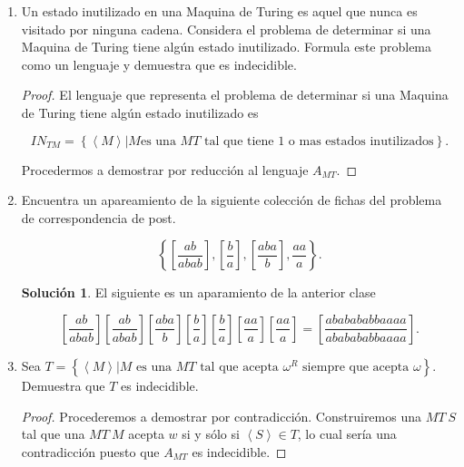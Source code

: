 \documentclass[letterpaper]{article}
\theoremstyle{definition}
\theoremstyle{lemathm}
\theoremstyle{lemathm}
\newtheorem{sol}{Solución}
\theoremstyle{lemathm}
\theoremstyle{lemademthm}
\newcommand{\pars}[1]{\left( #1 \right) }
\newcommand{\bracs}[1]{\left[ #1 \right] }
\newcommand{\inprod}[1]{\left\langle #1 \right\rangle }
\newcommand{\set}[1]{\left \{ #1 \right\} }
\newcommand{\1}{\mathbbm{1}}
\begin{document}
\begin{enumerate}
\begin{proof}
				\[B_{TM} = \set{\omega\omega' | \omega\in\set{a,b}^*, \omega' \in \set{0,1,\cdots,9}^+, \omega' \text{es un entero}, \omega = \inprod{M,\omega}, cond},\]

				donde $cond = M \text{ es una $MT$ y $M$ acepta $\omega$ en menos de $n$ pasos}$ (no lo pude formatear para que saltara de linea). Consideremos al homomorfismo dado por $h(a) = a, h(b) = b, h(i) = \epsilon, \forall i = 0,1,\cdots 9$. entonces la imagen $h\pars{B_{TM}} = A_{TM}$ el cual es una lenguaje indecidible por lo tanto la clase de lenguajes decidibles no es cerrada bajo homomorfismo.
			\end{proof}

			\item Un estado inutilizado en una Maquina de Turing es aquel que nunca es visitado por ninguna cadena. Considera el problema de determinar si una Maquina de Turing tiene algún estado inutilizado. Formula este problema como un lenguaje y demuestra que es indecidible.
			
			\begin{proof}
				El lenguaje que representa el problema de determinar si una Maquina de Turing tiene algún estado inutilizado es

				\[IN_{TM} = \set{\inprod{M} | M \text{es una $MT$ tal que tiene 1 o mas estados inutilizados}}.\]

				Procedermos a demostrar por reducción al lenguaje $A_{MT}$.
			\end{proof}

			\item Encuentra un apareamiento de la siguiente colección de fichas del problema de correspondencia de post.
			
			\[\set{\bracs{\frac{ab}{abab}},\bracs{\frac{b}{a}},\bracs{\frac{aba}{b}},\frac{aa}{a}}.\]

			\begin{sol}
				El siguiente es un aparamiento de la anterior clase

				\[\bracs{\frac{ab}{abab}}\bracs{\frac{ab}{abab}}\bracs{\frac{aba}{b}}\bracs{\frac{b}{a}}\bracs{\frac{b}{a}}\bracs{\frac{aa}{a}}\bracs{\frac{aa}{a}} = \bracs{\frac{ababababbaaaa}{ababababbaaaa}}.\]
			\end{sol}

			\item Sea $T = \set{\inprod{M} | M \text{ es una $MT$ tal que acepta $\omega^R$ siempre que acepta $\omega$}}$. Demuestra que $T$ es indecidible.
			
			\begin{proof}
				Procederemos a demostrar por contradicción. Construiremos una $MT \ S$ tal que una $MT \ M$ acepta $w$ si y sólo si $\inprod{S} \in T$, lo cual sería una contradicción puesto que $A_{MT}$ es indecidible.


\end{proof}
\end{enumerate}
\end{document}
